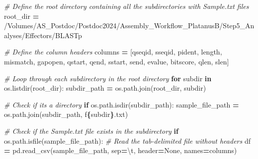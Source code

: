 \documentclass[
]{book}
\newenvironment{Shaded}{\begin{snugshade}}{\end{snugshade}}
\newcommand{\CharTok}[1]{\textcolor[rgb]{0.31,0.60,0.02}{#1}}
\newcommand{\CommentTok}[1]{\textcolor[rgb]{0.56,0.35,0.01}{\textit{#1}}}
\newcommand{\ControlFlowTok}[1]{\textcolor[rgb]{0.13,0.29,0.53}{\textbf{#1}}}
\newcommand{\KeywordTok}[1]{\textcolor[rgb]{0.13,0.29,0.53}{\textbf{#1}}}
\newcommand{\NormalTok}[1]{#1}
\newcommand{\OperatorTok}[1]{\textcolor[rgb]{0.81,0.36,0.00}{\textbf{#1}}}
\newcommand{\SpecialCharTok}[1]{\textcolor[rgb]{0.81,0.36,0.00}{\textbf{#1}}}
\newcommand{\SpecialStringTok}[1]{\textcolor[rgb]{0.31,0.60,0.02}{#1}}
\newcommand{\StringTok}[1]{\textcolor[rgb]{0.31,0.60,0.02}{#1}}
\newcommand{\VariableTok}[1]{\textcolor[rgb]{0.00,0.00,0.00}{#1}}
\begin{document}
\begin{Shaded}
\begin{Highlighting}[]
\CommentTok{\# Define the root directory containing all the subdirectories with Sample.txt files}
\NormalTok{root\_dir }\OperatorTok{=} \StringTok{\textquotesingle{}/Volumes/AS\_Postdoc/Postdoc2024/Assembly\_Workflow\_PlatanusB/Step5\_Analyses/Effectors/BLASTp\textquotesingle{}}

\CommentTok{\# Define the column headers}
\NormalTok{columns }\OperatorTok{=}\NormalTok{ [}\StringTok{\textquotesingle{}qseqid\textquotesingle{}}\NormalTok{, }\StringTok{\textquotesingle{}sseqid\textquotesingle{}}\NormalTok{, }\StringTok{\textquotesingle{}pident\textquotesingle{}}\NormalTok{, }\StringTok{\textquotesingle{}length\textquotesingle{}}\NormalTok{, }\StringTok{\textquotesingle{}mismatch\textquotesingle{}}\NormalTok{, }\StringTok{\textquotesingle{}gapopen\textquotesingle{}}\NormalTok{, }
           \StringTok{\textquotesingle{}qstart\textquotesingle{}}\NormalTok{, }\StringTok{\textquotesingle{}qend\textquotesingle{}}\NormalTok{, }\StringTok{\textquotesingle{}sstart\textquotesingle{}}\NormalTok{, }\StringTok{\textquotesingle{}send\textquotesingle{}}\NormalTok{, }\StringTok{\textquotesingle{}evalue\textquotesingle{}}\NormalTok{, }\StringTok{\textquotesingle{}bitscore\textquotesingle{}}\NormalTok{, }\StringTok{\textquotesingle{}qlen\textquotesingle{}}\NormalTok{, }\StringTok{\textquotesingle{}slen\textquotesingle{}}\NormalTok{]}

\CommentTok{\# Loop through each subdirectory in the root directory}
\ControlFlowTok{for}\NormalTok{ subdir }\KeywordTok{in}\NormalTok{ os.listdir(root\_dir):}
\NormalTok{    subdir\_path }\OperatorTok{=}\NormalTok{ os.path.join(root\_dir, subdir)}
    
    \CommentTok{\# Check if it\textquotesingle{}s a directory}
    \ControlFlowTok{if}\NormalTok{ os.path.isdir(subdir\_path):}
\NormalTok{        sample\_file\_path }\OperatorTok{=}\NormalTok{ os.path.join(subdir\_path, }\SpecialStringTok{f\textquotesingle{}}\SpecialCharTok{\{}\NormalTok{subdir}\SpecialCharTok{\}}\SpecialStringTok{.txt\textquotesingle{}}\NormalTok{)}
        
        \CommentTok{\# Check if the Sample.txt file exists in the subdirectory}
        \ControlFlowTok{if}\NormalTok{ os.path.isfile(sample\_file\_path):}
            \CommentTok{\# Read the tab{-}delimited file without headers}
\NormalTok{            df }\OperatorTok{=}\NormalTok{ pd.read\_csv(sample\_file\_path, sep}\OperatorTok{=}\StringTok{\textquotesingle{}}\CharTok{\textbackslash{}t}\StringTok{\textquotesingle{}}\NormalTok{, header}\OperatorTok{=}\VariableTok{None}\NormalTok{, names}\OperatorTok{=}\NormalTok{columns)}
            

\end{Highlighting}
\end{Shaded}
\end{document}
